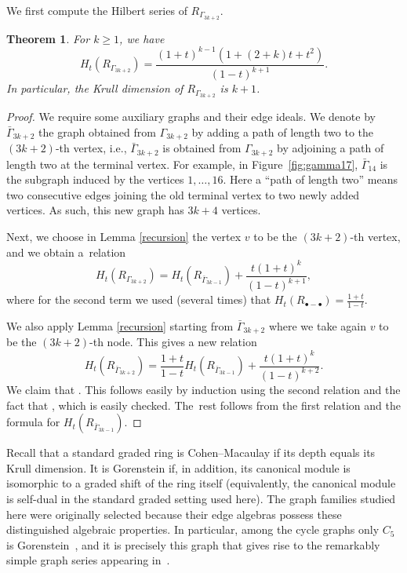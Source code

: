 \documentclass[pdftex]{sigma}
\numberwithin{equation}{section}
\newtheorem{Theorem}{Theorem}[section]
\theoremstyle{definition}
\begin{document}
We first compute the Hilbert series of $R_{\Gamma_{3k+2}}$.
\begin{Theorem}
For $k \geq 1$, we have
\begin{equation} \label{catherine}
H_t(R_{\Gamma_{3k+2}})=\frac{(1+t)^{k-1}(1+(2+k)t+t^2)}{(1-t)^{k+1}}.
\end{equation}
In particular, the Krull dimension of $R_{\Gamma_{3k+2}}$ is $k+1$.
\end{Theorem}
\begin{proof} We require some auxiliary graphs and their edge ideals.
We denote by $\bar{\Gamma}_{3k+2}$ the graph obtained from $\Gamma_{3 k+2}$ by adding a path of length two to the $(3k+2)$-th vertex, i.e.,
$\bar{\Gamma}_{3k+2}$ is obtained from $\Gamma_{3k+2}$ by adjoining a path of length two at the terminal vertex.
For example, in Figure~\ref{fig:gamma17}, $\bar{\Gamma}_{14}$ is the subgraph induced by the vertices $1,\dots,16$. Here a ``path of length two'' means two consecutive edges joining the old terminal vertex to two newly added vertices.
As such, this new graph has $3k+4$ vertices.

Next, we choose in Lemma \ref{recursion} the vertex $v$ to be the $(3k+2)$-th vertex, and we obtain a~relation
\[
H_t(R_{\Gamma_{3k+2}})=H_t(R_{\bar{\Gamma}_{3k-1}})+\frac{t(1+t)^k}{(1-t)^{k+1}},
\]
where for the second term we used (several times) that $H_t(R_{\bullet-\bullet})=\frac{1+t}{1-t}$.

We also apply Lemma \ref{recursion} starting from $\bar{\Gamma}_{3k+2}$ where we take again $v$ to be the $(3k+2)$-th node.
This gives a new relation
\[
H_t(R_{\bar{\Gamma}_{3k+2}})=\frac{1+t}{1-t} H_t(R_{\bar{\Gamma}_{3k-1}})+\frac{t(1+t)^k}{(1-t)^{k+2}}.
\]
We claim that . This follows easily by induction using
the second relation and the fact that , which is easily checked.
The~rest follows from the first relation and the formula for $H_t(R_{\bar{\Gamma}_{3k-1}})$.
\end{proof}

Recall that a standard graded ring is Cohen--Macaulay if its depth equals its Krull dimension. It is Gorenstein if, in addition, its canonical module is isomorphic to a graded shift of the ring itself (equivalently, the canonical module is self-dual in the standard graded setting used here).
The graph families studied here were originally selected because
their edge algebras possess these distinguished algebraic properties. In
particular, among the cycle graphs only $C_5$ is Gorenstein~\cite{Edge}, and it is
precisely this graph that gives rise to the remarkably simple graph series
appearing in~\cite{BJM}.
\end{document}
